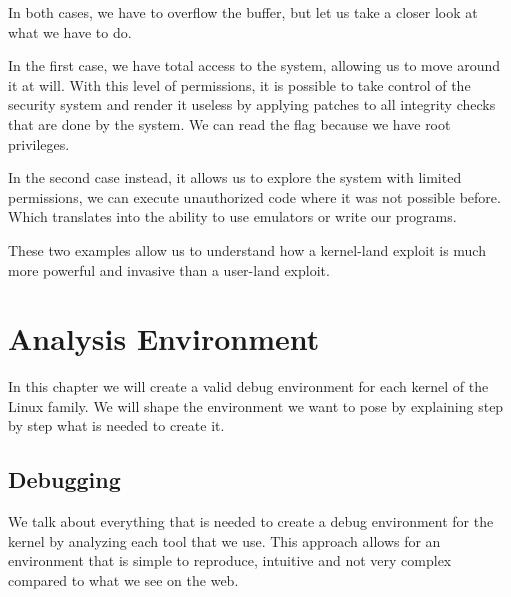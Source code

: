 \documentclass{masterthesis}
\begin{document}
In both cases, we have to overflow the buffer, but let us take a closer look at what we have to do.

In the first case, we have total access to the system, allowing us to move around it at will.
With this level of permissions, it is possible to take control of the security system and render it useless by applying patches to all integrity checks that are done by the system.
We can read the flag because we have root privileges.

In the second case instead, it allows us to explore the system with limited permissions, we can execute unauthorized code where it was not possible before. Which translates into the ability to use emulators or write our programs.

These two examples allow us to understand how a kernel-land exploit is much more powerful and invasive than a user-land exploit.


\chapter{Analysis Environment}
\label{ch:analyze}
In this chapter we will create a valid debug environment for each kernel of the Linux family.
We will shape the environment we want to pose by explaining step by step what is needed to create it.
\section{Debugging}
\label{sect:debugging}
We talk about everything that is needed to create a debug environment for the kernel by analyzing each tool that we use.
This approach allows for an environment that is simple to reproduce, intuitive and not very complex compared to what we see on the web.
\end{document}
